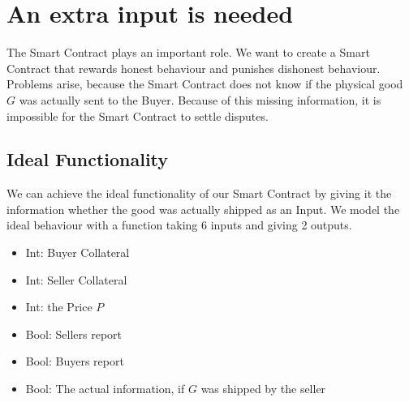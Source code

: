 \documentclass{cacthesis}
\begin{document}


\section{An extra input is needed}
The Smart Contract plays an important role. We want to create a Smart Contract that rewards honest behaviour and punishes dishonest behaviour.\newline
Problems arise, because the Smart Contract does not know if the physical good $G$ was actually sent to the Buyer. Because of this missing information, it is impossible for the Smart Contract to settle disputes.
\subsection{Ideal Functionality}
We can achieve the ideal functionality of our Smart Contract by giving it the information whether the good was actually shipped as an Input. We model the ideal behaviour with a function taking 6 inputs and giving 2 outputs.

\begin{itemize}
\item{Int: Buyer Collateral}
\item{Int: Seller Collateral}
\item{Int: the Price $P$}
\item{Bool: Sellers report}
\item{Bool: Buyers report}
\item{Bool: The actual information, if $G$ was shipped by the seller}
\end{itemize}
\end{document}

